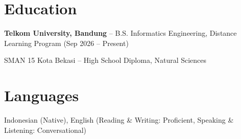 \documentclass[a4paper,10pt]{article}
\begin{document}
\section{Education}
\begin{itemize}[leftmargin=0.15in, label={}, nosep]
    \small{\item{\textbf{Telkom University, Bandung} -- B.S. Informatics Engineering, Distance Learning Program (Sep 2026 -- Present)}}
    \small{\item{SMAN 15 Kota Bekasi -- High School Diploma, Natural Sciences}}
\end{itemize}

\section{Languages}
\begin{itemize}[leftmargin=0.15in, label={}, nosep]
    \small{\item{Indonesian (Native), English (Reading \& Writing: Proficient, Speaking \& Listening: Conversational)}}
\end{itemize}

\end{document}
